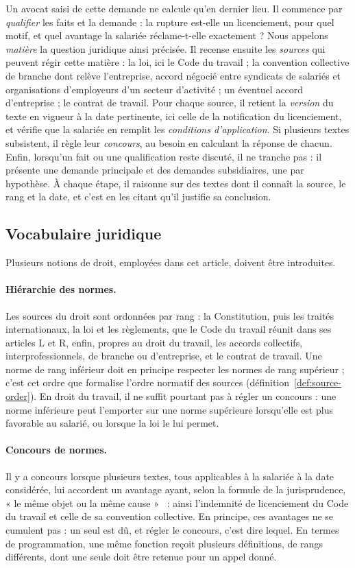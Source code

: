 \documentclass[review]{jflart}
\begin{document}
Un avocat saisi de cette demande ne calcule qu'en dernier lieu. Il commence par
\emph{qualifier} les faits et la demande : la rupture est-elle un licenciement,
pour quel motif, et quel avantage la salariée réclame-t-elle exactement ? Nous
appelons \emph{matière} la question juridique ainsi précisée. Il recense
ensuite les \emph{sources} qui peuvent régir cette matière : la loi, ici le
Code du travail ; la convention collective de branche dont relève l'entreprise,
accord négocié entre syndicats de salariés et organisations d'employeurs d'un
secteur d'activité ; un éventuel accord d'entreprise ; le contrat de travail.
Pour chaque source, il retient la \emph{version} du texte en vigueur à la date
pertinente, ici celle de la notification du licenciement, et vérifie que la
salariée en remplit les \emph{conditions d'application}. Si plusieurs textes
subsistent, il règle leur \emph{concours}, au besoin en calculant la
réponse de chacun. Enfin, lorsqu'un fait
ou une qualification reste discuté, il ne tranche pas : il présente une demande
principale et des demandes subsidiaires, une par hypothèse. À chaque étape, il
raisonne sur des textes dont il connaît la source, le rang et la date, et c'est
en les citant qu'il justifie sa conclusion.

\subsection{Vocabulaire juridique}\label{sec:vocabulaire}
%
Plusieurs notions de droit, employées dans cet article, doivent être introduites.

\paragraph{Hiérarchie des normes.} Les sources du droit sont ordonnées par
  rang : la Constitution, puis les traités internationaux, la loi et les
  règlements, que le Code du travail réunit dans ses articles L et R, enfin,
  propres au droit du travail, les accords collectifs, interprofessionnels, de
  branche ou d'entreprise, et le contrat de travail. Une norme de rang
  inférieur doit en principe respecter les normes de rang supérieur ; c'est cet
  ordre que formalise l'ordre normatif des sources
  (définition~\ref{def:source-order}). En droit du travail, il ne suffit
  pourtant pas à régler un concours : une norme inférieure peut l'emporter sur
  une norme supérieure lorsqu'elle est plus favorable au salarié, ou lorsque la
  loi le lui permet.
\paragraph{Concours de normes.} Il y a concours lorsque plusieurs textes, tous
  applicables à la salariée à la date considérée, lui accordent un avantage
  ayant, selon la formule de la jurisprudence, « le même objet ou la même
  cause »~\cite{cassap1988} : ainsi l'indemnité de licenciement du Code du
  travail et celle de sa convention collective. En principe, ces avantages ne
  se cumulent pas : un seul est dû, et régler le concours, c'est dire lequel.
  En termes de programmation, une même fonction reçoit plusieurs définitions,
  de rangs différents, dont une seule doit être retenue pour un appel donné.
\end{document}

